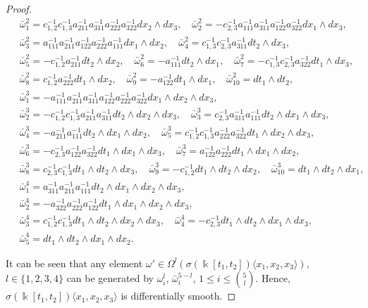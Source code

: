 \documentclass{amsart}
\theoremstyle{definition}
\theoremstyle{remark}
\numberwithin{equation}{section}
\begin{document}
\begin{proof}
\begin{align*}
    &\ \bar{\omega}_1^2=c_{1,2}^{-1}c_{1,3}^{-1}a_{211}^{-1}a_{311}^{-1}a_{222}^{-1}a_{322}^{-1}dx_2\wedge dx_3, \quad  \bar{\omega}_2^2=-c_{2,3}^{-1}a_{111}^{-1}a_{311}^{-1}a_{122}^{-1}a_{322}^{-1}dx_1\wedge dx_3, \\
    &\ \bar{\omega}_3^2 = a_{111}^{-1}a_{211}^{-1}a_{122}^{-1}a_{222}^{-1}a_{111}^{-1}dx_1\wedge dx_2, \quad \bar{\omega}_4^2 = c_{1,3}^{-1}c_{2,3}^{-1}a_{311}^{-1}dt_2\wedge dx_3, \\
    &\ \bar{\omega}_5^2 = -c_{1,2}^{-1}a_{211}^{-1}dt_2\wedge dx_2, \quad \bar{\omega}_6^2 = -a_{111}^{-1}dt_2\wedge dx_1, \quad \bar{\omega}_7^2 = -c_{1,3}^{-1}c_{2,3}^{-1}a_{322}^{-1}dt_1\wedge dx_3,\\
    &\ \bar{\omega}_8^2 = c_{1,2}^{-1}a_{222}^{-1}dt_1\wedge dx_2, \quad \bar{\omega}_9^2 = -a_{122}^{-1}dt_1\wedge dx_1, \quad \bar{\omega}_{10}^2 = dt_1\wedge dt_2,\\
    &\ \bar{\omega}_1^3=-a_{111}^{-1}a_{211}^{-1}a_{311}^{-1}a_{122}^{-1}a_{222}^{-1}a_{322}^{-1}dx_1\wedge dx_2\wedge dx_3, \\
    &\ \bar{\omega}_2^3=-c_{1,2}^{-1}c_{1,3}^{-1}a_{211}^{-1}a_{311}^{-1}dt_2\wedge dx_2 \wedge dx_3, \quad   \bar{\omega}_3^3=c_{2,3}^{-1}a_{311}^{-1}a_{111}^{-1}dt_2\wedge dx_1\wedge dx_3, \\
   &\ \bar{\omega}_4^3=-a_{211}^{-1}a_{111}^{-1}dt_2 \wedge dx_1 \wedge dx_2, \quad \bar{\omega}_5^3=c_{1,2}^{-1}c_{1,3}^{-1}a_{222}^{-1}a_{322}^{-1}dt_1 \wedge dx_2 \wedge dx_3, \\
   &\ \bar{\omega}_6^3=-c_{2,3}^{-1}a_{122}^{-1}a_{322}^{-1}dt_1 \wedge dx_1 \wedge dx_3, \quad \bar{\omega}_7^3=a_{122}^{-1}a_{222}^{-1}dt_1 \wedge dx_1 \wedge dx_2, \\
   &\ \bar{\omega}_8^3=c_{2,3}^{-1}c_{1,3}^{-1}dt_1 \wedge dt_2 \wedge dx_3, \quad \bar{\omega}_9^3=-c_{1,2}^{-1}dt_1 \wedge dt_2 \wedge dx_2, \quad \bar{\omega}_{10}^3=dt_1 \wedge dt_2 \wedge dx_1, \\
   &\ \bar{\omega}_1^4=a_{311}^{-1}a_{211}^{-1}a_{111}^{-1}dt_2\wedge dx_1 \wedge dx_2 \wedge dx_3, \\
   &\ \bar{\omega}_2^4=-a_{322}^{-1}a_{222}^{-1}a_{122}^{-1}dt_1\wedge dx_1 \wedge dx_2 \wedge dx_3, \\
   &\ \bar{\omega}_3^4=c_{1,2}^{-1}c_{1,3}^{-1}dt_1\wedge dt_2 \wedge dx_2 \wedge dx_3, \quad \bar{\omega}_4^4=-c_{2,3}^{-1}dt_1\wedge dt_2 \wedge dx_1 \wedge dx_3, \\
   &\ \bar{\omega}_5^4=dt_1\wedge dt_2 \wedge dx_1 \wedge dx_2.
\end{align*}

It can be seen that any element $\omega' \in \Omega^{l}(\sigma(\Bbbk[t_1, t_2])\langle x_1, x_2, x_3\rangle)$, $l\in \{1, 2, 3, 4 \}$ can be generated by $\omega_{i}^{l}$, $\bar{\omega}_{i}^{5-l}$, $1\leq i \leq \binom{5}{l}$. Hence, $\sigma(\Bbbk[t_1, t_2])\langle x_1, x_2, x_3 \rangle$ is differentially smooth.
\end{proof}
\end{document}
